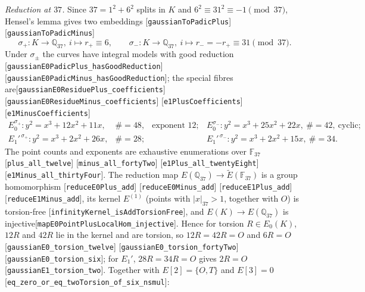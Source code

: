 \documentclass[10pt]{article}
\theoremstyle{definition}
\theoremstyle{remark}
\newcommand{\Q}{\mathbb{Q}}
\newcommand{\F}{\mathbb{F}}
\newcommand{\Oinf}{O}
\newcommand{\leanref}[1]{{\scriptsize\textup{[\texttt{#1}]}}\allowbreak}
\begin{document}
\emph{Reduction at $37$.}  Since $37=1^2+6^2$ splits in $K$ and
$6^2\equiv31^2\equiv-1\pmod{37}$, Hensel's lemma gives two embeddings
\leanref{gaussian\allowbreak To\allowbreak Padic\allowbreak Plus} \leanref{gaussian\allowbreak To\allowbreak Padic\allowbreak Minus}
\[
 \sigma_+:K\to\Q_{37},\ i\mapsto r_+\equiv6,\qquad
 \sigma_-:K\to\Q_{37},\ i\mapsto r_-=-r_+\equiv31\pmod{37} .
\]
Under $\sigma_\pm$ the curves have integral models with good reduction
\leanref{gaussian\allowbreak E0\allowbreak Padic\allowbreak Plus\_\allowbreak has\allowbreak Good\allowbreak Reduction} \leanref{gaussian\allowbreak E0\allowbreak Padic\allowbreak Minus\_\allowbreak has\allowbreak Good\allowbreak Reduction};
the special fibres are\leanref{gaussian\allowbreak E0\allowbreak Residue\allowbreak Plus\_\allowbreak coefficients} \leanref{gaussian\allowbreak E0\allowbreak Residue\allowbreak Minus\_\allowbreak coefficients} \leanref{e1\allowbreak Plus\allowbreak Coefficients} \leanref{e1\allowbreak Minus\allowbreak Coefficients}
\[
\begin{array}{llll}
 E_0^{\sigma_+}: y^2=x^3+12x^2+11x, & \#=48, & \text{exponent }12; &
 E_0^{\sigma_-}: y^2=x^3+25x^2+22x, \ \#=42,\ \text{cyclic};\\
 E_1'^{\,\sigma_+}: y^2=x^3+2x^2+26x, & \#=28; &&
 E_1'^{\,\sigma_-}: y^2=x^3+2x^2+15x, \ \#=34 .
\end{array}
\]
The point counts and exponents are exhaustive enumerations over $\F_{37}$
\leanref{plus\_\allowbreak all\_\allowbreak twelve} \leanref{minus\_\allowbreak all\_\allowbreak forty\allowbreak Two} \leanref{e1\allowbreak Plus\_\allowbreak all\_\allowbreak twenty\allowbreak Eight} \leanref{e1\allowbreak Minus\_\allowbreak all\_\allowbreak thirty\allowbreak Four}.
The reduction map $E(\Q_{37})\to\tilde E(\F_{37})$ is a group homomorphism
\cite[VII.2.1]{Silverman} \leanref{reduce\allowbreak E0\allowbreak Plus\_\allowbreak add} \leanref{reduce\allowbreak E0\allowbreak Minus\_\allowbreak add} \leanref{reduce\allowbreak E1\allowbreak Plus\_\allowbreak add} \leanref{reduce\allowbreak E1\allowbreak Minus\_\allowbreak add},
its kernel $E^{(1)}$ (points with $|x|_{37}>1$, together with $\Oinf$) is
torsion-free \cite[IV.6.1, VII.3.1]{Silverman} \leanref{infinity\allowbreak Kernel\_\allowbreak is\allowbreak Add\allowbreak Torsion\allowbreak Free},
and $E(K)\to E(\Q_{37})$ is injective\leanref{map\allowbreak E0\allowbreak Point\allowbreak Plus\allowbreak Local\allowbreak Hom\_\allowbreak injective}.
Hence for torsion $R\in E_0(K)$, $12R$ and $42R$ lie in the kernel and are
torsion, so $12R=42R=\Oinf$ and $6R=\Oinf$
\leanref{gaussian\allowbreak E0\_\allowbreak torsion\_\allowbreak twelve} \leanref{gaussian\allowbreak E0\_\allowbreak torsion\_\allowbreak forty\allowbreak Two} \leanref{gaussian\allowbreak E0\_\allowbreak torsion\_\allowbreak six};
for $E_1'$, $28R=34R=\Oinf$ gives $2R=\Oinf$\leanref{gaussian\allowbreak E1\_\allowbreak torsion\_\allowbreak two}.
Together with $E[2]=\{\Oinf,T\}$ and $E[3]=0$
\leanref{eq\_\allowbreak zero\_\allowbreak or\_\allowbreak eq\_\allowbreak two\allowbreak Torsion\_\allowbreak of\_\allowbreak six\_\allowbreak nsmul}:
\end{document}
